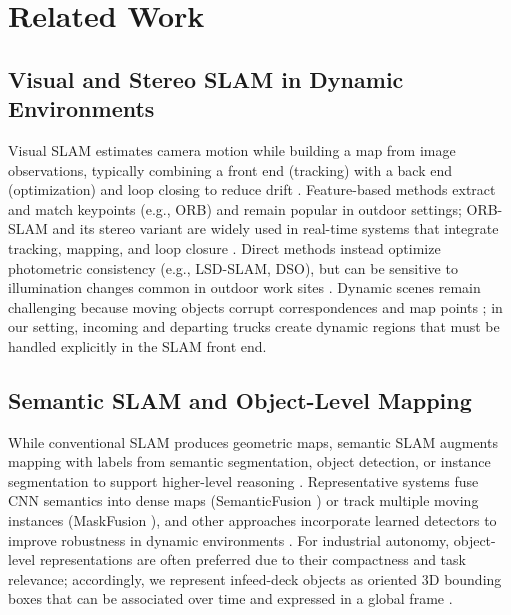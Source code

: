 \documentclass[letterpaper, 10 pt, conference]{IEEEtran}  %
\begin{document}
\section{Related Work}
\label{sec:related}

\subsection{Visual and Stereo SLAM in Dynamic Environments}
Visual SLAM estimates camera motion while building a map from image observations, typically combining a front end (tracking) with a back end (optimization) and loop closing to reduce drift \cite{cadena_slam_survey}. Feature-based methods extract and match keypoints (e.g., ORB) and remain popular in outdoor settings; ORB-SLAM and its stereo variant are widely used in real-time systems that integrate tracking, mapping, and loop closure \cite{orbslam,orbslam2}. Direct methods instead optimize photometric consistency (e.g., LSD-SLAM, DSO), but can be sensitive to illumination changes common in outdoor work sites \cite{lsdslam,dso}. Dynamic scenes remain challenging because moving objects corrupt correspondences and map points \cite{dsslam,dynseg}; in our setting, incoming and departing trucks create dynamic regions that must be handled explicitly in the SLAM front end.

\subsection{Semantic SLAM and Object-Level Mapping}
While conventional SLAM produces geometric maps, semantic SLAM augments mapping with labels from semantic segmentation, object detection, or instance segmentation to support higher-level reasoning \cite{semanticfusion}. Representative systems fuse CNN semantics into dense maps (SemanticFusion \cite{semanticfusion}) or track multiple moving instances (MaskFusion \cite{maskfusion}), and other approaches incorporate learned detectors to improve robustness in dynamic environments \cite{dsslam}. For industrial autonomy, object-level representations are often preferred due to their compactness and task relevance; accordingly, we represent infeed-deck objects as oriented 3D bounding boxes that can be associated over time and expressed in a global frame \cite{semanticfusion,maskfusion}.
\end{document}
